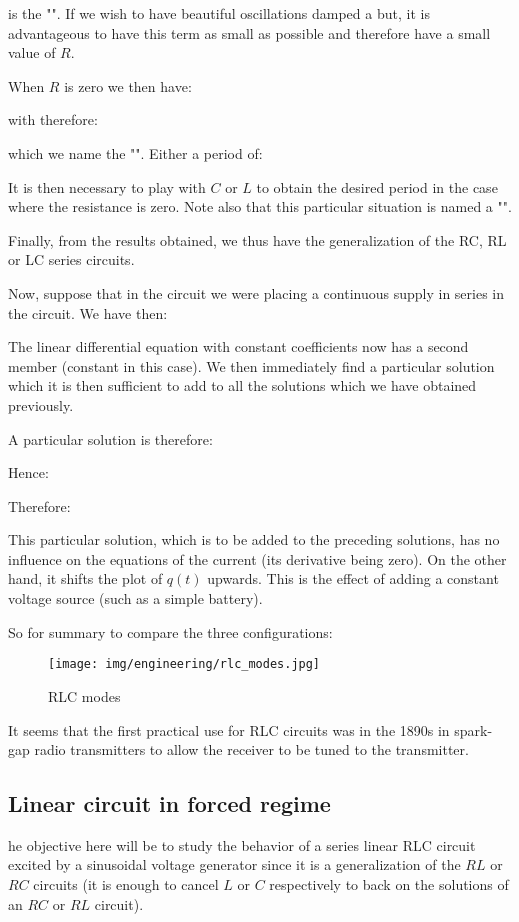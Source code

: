 	is the "". If we wish to have beautiful oscillations damped a but, it is advantageous to have this term as small as possible and therefore have a small value of $R$.

	When $R$ is zero we then have:
	
	with therefore:
	
	which we name the "". Either a period of:
	
	It is then necessary to play with $C$ or $L$ to obtain the desired period in the case where the resistance is zero. Note also that this particular situation is named a "".

	Finally, from the results obtained, we thus have the generalization of the RC, RL or LC series circuits.

	Now, suppose that in the circuit we were placing a continuous supply in series in the circuit. We have then:
	
	The linear differential equation with constant coefficients now has a second member (constant in this case). We then immediately find a particular solution which it is then sufficient to add to all the solutions which we have obtained previously.

	A particular solution is therefore:
	
	Hence:
	
	Therefore:
	
	This particular solution, which is to be added to the preceding solutions, has no influence on the equations of the current (its derivative being zero). On the other hand, it shifts the plot of $q(t)$ upwards. This is the effect of adding a constant voltage source (such as a simple battery).
	
	So for summary to compare the three configurations:
	 \begin{figure}[H]
		\centering
		\texttt{[image: img/engineering/rlc\_modes.jpg]}
		\caption[]{RLC modes}
	\end{figure}
	\begin{tcolorbox}[title=Remark,colframe=black,arc=10pt]
	It seems that the first practical use for RLC circuits was in the 1890s in spark-gap radio transmitters to allow the receiver to be tuned to the transmitter.
	\end{tcolorbox}
	
	\pagebreak
	\subsection{Linear circuit in forced regime}
	he objective here will be to study the behavior of a series linear RLC circuit excited by a sinusoidal voltage generator since it is a generalization of the $RL$ or $RC$ circuits  (it is enough to cancel $L$ or $C$ respectively to back on the solutions of an $RC$ or $RL$ circuit).

